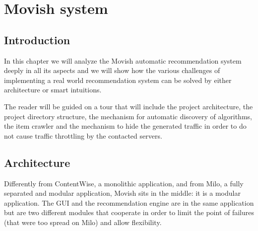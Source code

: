 \chapter{Movish system}
\label{chapter:movish_system}

\section{Introduction}
\label{sec:movish_system_introduction}

In this chapter we will analyze the Movish automatic recommendation system deeply in all its aspects and we will show how the various challenges of implementing a real world recommendation system can be solved by either architecture or smart intuitions.

The reader will be guided on a tour that will include the project architecture, the project directory structure, the mechanism for automatic discovery of algorithms, the item crawler and the mechanism to hide the generated traffic in order to do not cause traffic throttling by the contacted servers.

\section{Architecture}
\label{sec:architecture}

Differently from ContentWise, a monolithic application, and from Milo, a fully separated and modular application, Movish sits in the middle: it is a modular application. The \ac{GUI} and the recommendation engine are in the same application but are two different modules that cooperate in order to limit the point of failures (that were too spread on Milo) and allow flexibility.

